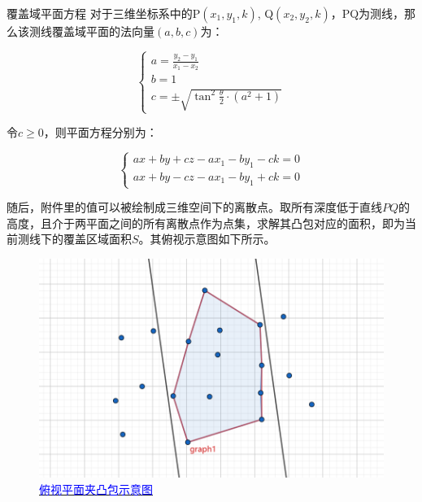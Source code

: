 \begin{mcmTheorem}{覆盖域平面方程}
对于三维坐标系中的P$(x_1, y_1, k)$, Q$(x_2, y_2, k)$，PQ为测线，那么该测线覆盖域平面的法向量$(a, b, c)$为：

\begin{equation}
    \begin{cases}
        a = \frac{y_2-y_1}{x_1-x_2} \\
        b = 1 \\
        c = \pm \sqrt{\tan^2\frac{\theta}{2} \cdot (a^2+1)}
    \end{cases}
\end{equation}

令$c \geq 0$，则平面方程分别为：

\begin{equation}
    \begin{cases}
        ax + by + cz - ax_1 - by_1 - ck = 0 \\
        ax + by - cz - ax_1 - by_1 + ck = 0
    \end{cases}
\end{equation}
\end{mcmTheorem}

随后，附件里的值可以被绘制成三维空间下的离散点。取所有深度低于直线$PQ$的高度，且介于两平面之间的所有离散点作为点集，求解其凸包对应的面积，即为当前测线下的覆盖区域面积$S$。其俯视示意图如下所示。

\begin{figure}[h]   
    \centering
    \includegraphics[scale=0.3]{res/img/俯视平面夹凸包示意图.png}
    \caption{\href{https://www.geogebra.org/m/vndf5wzp}{\textcolor{blue}{俯视平面夹凸包示意图}}}
    \label{fig:俯视平面夹凸包示意图}
\end{figure}


